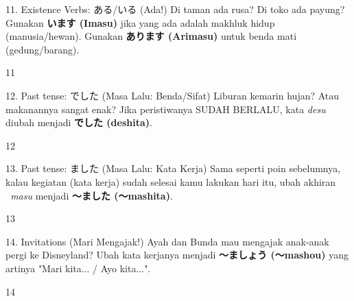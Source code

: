 \begin{lessonbox}{11. Existence Verbs: ある/いる (Ada!)}
    Di taman ada rusa? Di toko ada payung? Gunakan \textbf{います (Imasu)} jika yang ada adalah makhluk hidup (manusia/hewan). Gunakan \textbf{あります (Arimasu)} untuk benda mati (gedung/barang).
\end{lessonbox}
\begin{convobox}{11}
    \noindent
      
      

    \vspace{1.5em}
\end{convobox}

\begin{lessonbox}{12. Past tense: でした (Masa Lalu: Benda/Sifat)}
    Liburan kemarin hujan? Atau makanannya sangat enak? Jika peristiwanya SUDAH BERLALU, kata \textit{desu} diubah menjadi \textbf{でした (deshita)}.
\end{lessonbox}
\begin{convobox}{12}
    \noindent
      
     

    \vspace{1.5em}
\end{convobox}

\begin{lessonbox}{13. Past tense: ました (Masa Lalu: Kata Kerja)}
    Sama seperti poin sebelumnya, kalau kegiatan (kata kerja) sudah selesai kamu lakukan hari itu, ubah akhiran \textit{~masu} menjadi \textbf{〜ました (〜mashita)}.
\end{lessonbox}
\begin{convobox}{13}
    \noindent
      

    \vspace{1.5em}
\end{convobox}

\begin{lessonbox}{14. Invitations (Mari Mengajak!)}
    Ayah dan Bunda mau mengajak anak-anak pergi ke Disneyland? Ubah kata kerjanya menjadi \textbf{〜ましょう (〜mashou)} yang artinya "Mari kita... / Ayo kita...".
\end{lessonbox}
\begin{convobox}{14}
    \noindent
      

    \vspace{1.5em}
\end{convobox}

